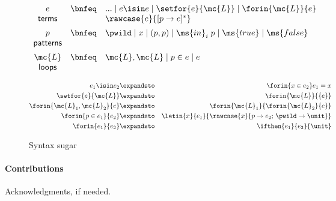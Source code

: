 \documentclass[preprint]{sigplanconf}
\renewcommand{\pipe}{\;|\;}
\begin{document}
\begin{figure}
  \[\begin{array}{ccl}
  e &\bnfeq& ... \pipe e \isin e \pipe \setfor{e}{\mc{L}}
             \pipe \forin{\mc{L}}{e}\\
  \textsf{terms}&& \rawcase{e}{[{p} \to {e}]^*}
  \vspace{0.5em}\\
  p &\bnfeq& \pwild \pipe x \pipe (p,p) \pipe \ms{in}_i\;p
             \pipe \ms{true} \pipe \ms{false}\\
  \textsf{patterns}
  \vspace{0.5em}\\
  \mc{L} &\bnfeq& \mc{L}, \mc{L} \pipe p \in e \pipe e\\
  \textsf{loops}
  \end{array}\]

  \begin{eqnarray*}
    e_1 \isin e_2            &\expandsto& \forin{x \in e_2} e_1 = x\\
    \setfor{e}{\mc{L}}       &\expandsto& \forin{\mc{L}}{\{e\}}\\
    \forin{\mc{L}_1,\mc{L}_2}{e}
    &\expandsto& \forin{\mc{L}_1}{\forin{\mc{L}_2}{e}}\\
    \forin{p\in e_1}{e_2}
    &\expandsto& \letin{x}{e_1}{\rawcase{x}{p \to e_2;\,\pwild \to \unit}}\\
    \forin{e_1}{e_2} &\expandsto& \ifthen{e_1}{e_2}{\unit}
  \end{eqnarray*}
  \caption{Syntax sugar}
\end{figure}

\paragraph{Contributions}

\acks

Acknowledgments, if needed.






\end{document}
